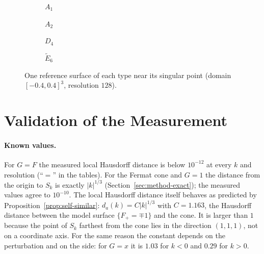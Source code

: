 \begin{figure}[!h]
    \centering
    \begin{subfigure}{0.24\textwidth}\centering
        \caption{$A_1$}\end{subfigure}\hfill
    \begin{subfigure}{0.24\textwidth}\centering
        \caption{$A_2$}\end{subfigure}\hfill
    \begin{subfigure}{0.24\textwidth}\centering
        \caption{$D_4$}\end{subfigure}\hfill
    \begin{subfigure}{0.24\textwidth}\centering
        \caption{$\tilde E_6$}\end{subfigure}
    \caption[Representatives of the four types]{One reference surface of each type
    near its singular point (domain $[-0.4,0.4]^3$, resolution $128$).}
    \label{fig:types}
\end{figure}

\section{Validation of the Measurement}
\label{sec:exp-validation}

\paragraph{Known values.} For $G=F$ the measured local Hausdorff distance is
below $10^{-12}$ at every $k$ and resolution (``$=$'' in the tables). For the
Fermat cone and $G=1$ the distance from the origin to $S_k$ is exactly
$|k|^{1/3}$ (Section~\ref{sec:method-exact}); the measured values agree to
$10^{-10}$. The local Hausdorff distance itself behaves as predicted by
Proposition~\ref{prop:self-similar}: $d_a(k)=C|k|^{1/3}$ with $C=1.163$, the
Hausdorff distance between the model surface $\{F_+=\mp1\}$ and the cone. It is
larger than $1$ because the point of $S_k$ farthest from the cone lies in the
direction $(1,1,1)$, not on a coordinate axis. For the same reason the constant
depends on the perturbation and on the side: for $G=x$ it is $1.03$ for $k<0$
and $0.29$ for $k>0$.

